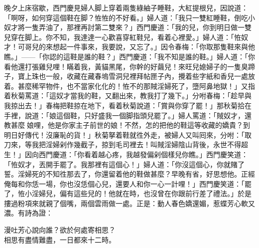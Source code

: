晚夕上床宿歇，西門慶見婦人脚上穿着兩隻綠紬子睡鞋，大紅提根兒，因說道：「啊呀，如何穿這個鞋在脚？恠恠的不好看。」婦人道：「我只一雙紅睡鞋，倒吃小奴才將一隻弄油了，那裡再討第二雙來？」西門慶道：「我的兒，你到明日做一雙兒穿在脚上。你不知，我達達一心歡喜穿紅鞋兒，看着心裡愛。」婦人道：「恠奴才！可哥兒的來想起一件事來，我要說，又忘了。」因令春梅：「你取那隻鞋來與他瞧。」——「你認的這鞋是誰的鞋？」西門慶道：「我不知是誰的鞋。」婦人道：「你看他還打張雞兒哩！瞞着我，黃貓黑尾，你幹的好繭兒！來旺兒媳婦子的一隻臭蹄子，寶上珠也一般，收藏在藏春塢雪洞兒裡拜帖匣子內，攪着些字紙和香兒一處放着。甚麼稀罕物件，也不當家化化的！恠不的那賊淫婦死了，墮阿鼻地獄！」{}又指着秋菊罵道：「這奴才當我的鞋，又翻出來，教我打了幾下。」分咐春梅：「趁早與我掠出去！」春梅把鞋掠在地下，看着秋菊說道：「賞與你穿了罷！」那秋菊拾在手裡，說道：「娘這個鞋，只好盛我一個脚指頭兒罷了。」婦人罵道：「賊奴才，還教甚麼𣭈娘哩，他是你家主子前世的娘！不然，怎的把他的鞋這等收藏的嬌貴？到明日好傳代！沒廉恥的貨！」秋菊拏着鞋就徃外走，被婦人又叫囘來，分咐：「取刀來，等我把淫婦剁作幾截子，掠到毛司裡去！叫賊淫婦陰山背後，永世不得超生！」{}因向西門慶道：「你看着越心疼，我越發偏剁個樣兒你瞧。」西門慶笑道：「恠奴才，丟開手罷了。我那裡有這個心！」婦人道：「你沒這個心，你就賭了誓。淫婦死的不知徃那去了，你還留着他的鞋做甚麼？早晚有省，好思想他。正經俺每和你恁一場，你也沒恁個心兒，還要人和你一心一計哩！」{}西門慶笑道：「罷了，恠小淫婦兒，偏有這些兒的！他就在時，也沒曾在你跟前行差了禮法。」於是摟過粉項來就親了個嘴，兩個雲雨做一處。正是：動人春色嬌還媚，惹蝶芳心軟又濃。有詩為證：

\begin{myquote}
漫吐芳心說向誰？欲於何處寄相思？\\相思有盡情難盡，一日都來十二時。
\end{myquote}

